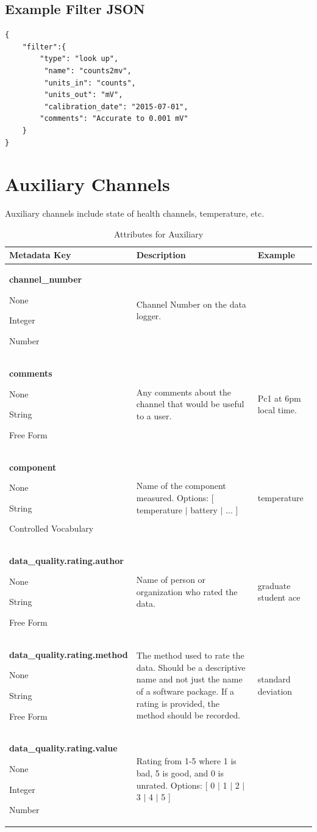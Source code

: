 \documentclass[12pt]{article}
\newcommand{\True}[0]{{\color{Red}{\textbf{True}}}}
\newcommand{\False}[0]{{\color{Teal}{\textbf{False}}}}
\newcommand{\entry}[7]{
	\textbf{#1} 
	\begin{itemize}[topsep=5pt,itemsep=-.1pt,parsep=-2pt,partopsep=0pt,labelwidth=2em,align=left,itemindent=1em]
		\begin{small}
			\item[Required:] #2
			\item[Units:] #3
			\item[Type:] #4
			\item[Style:] #5
		\end{small}
	\end{itemize} & #6 & #7 \\ \midrule}
\begin{document}
\subsection{Example Filter JSON} 

\begin{verbatim}
{
    "filter":{
        "type": "look up",
         "name": "counts2mv",
         "units_in": "counts",
         "units_out": "mV",
         "calibration_date": "2015-07-01",
        "comments": "Accurate to 0.001 mV"
    }
}
\end{verbatim}

\clearpage
\newpage

\section{Auxiliary Channels}

Auxiliary channels include state of health channels, temperature, etc.  
\begin{table}[h!]
	\caption[Attributes of Auxiliary ]{Attributes for Auxiliary  }
	\begin{tabular}{p{}>{\raggedright}p{}>{\raggedright\arraybackslash}p{}}
		\textbf{Metadata Key} & \textbf{Description} & \textbf{Example} \\ \toprule
		\entry{channel\_number}{\True}{None}{Integer}{Number}{Channel Number on the data logger.}{1}
		\entry{comments}{\False}{None}{String}{Free Form}{Any comments about the channel that would be useful to a user.}{Pc1 at 6pm local time.}
		\entry{component}{\True}{None}{String}{Controlled Vocabulary}{Name of the component measured.  Options: [ temperature $|$ battery $|$ ... ]}{temperature}
		\entry{data\_quality.rating.author}{\False}{None}{String}{Free Form}{Name of person or organization who rated the data.}{graduate student ace}
		\entry{data\_quality.rating.method}{\False}{None}{String}{Free Form}{The method used to rate the data.  Should be a descriptive name and not just the name of a software package.  If a rating is provided, the method should be recorded.}{standard deviation}
		\entry{data\_quality.rating.value}{\True}{None}{Integer}{Number}{Rating from 1-5 where 1 is bad, 5 is good, and 0 is unrated.  Options: [ 0 $|$ 1 $|$ 2 $|$ 3 $|$ 4 $|$ 5 ]}{4}
	\end{tabular}
	\label{tab:auxiliary}
\end{table}
\end{document}

